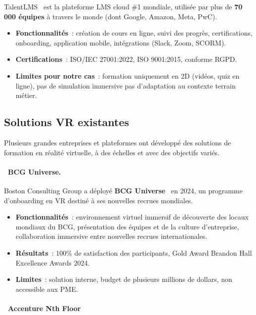 TalentLMS~\cite{talentlms2026} est la plateforme LMS cloud \#1 mondiale, utilisée par plus
de \textbf{70 000 équipes} à travers le monde (dont Google, Amazon, Meta, PwC).

\begin{itemize}
  \item \textbf{Fonctionnalités}~: création de cours en ligne, suivi des progrès, certifications,
    onboarding, application mobile, intégrations (Slack, Zoom, SCORM).
  \item \textbf{Certifications}~: ISO/IEC 27001:2022, ISO 9001:2015, conforme RGPD.
  \item \textbf{Limites pour notre cas}~: formation uniquement en 2D (vidéos, quiz en ligne),
    pas de simulation immersive pas d'adaptation au contexte terrain métier.
\end{itemize}

\subsection{Solutions VR existantes}

Plusieurs grandes entreprises et plateformes ont développé des solutions de formation en
réalité virtuelle, à des échelles et avec des objectifs variés.

\paragraph*{\textbullet~BCG Universe.}

Boston Consulting Group a déployé \textbf{BCG Universe}~\cite{bcg2024} en 2024, un programme
d'onboarding en VR destiné à ses nouvelles recrues mondiales.

\begin{itemize}
  \item \textbf{Fonctionnalités}~: environnement virtuel immersif de découverte des
    locaux mondiaux du BCG, présentation des équipes et de la culture d'entreprise,
    collaboration immersive entre nouvelles recrues internationales.
  \item \textbf{Résultats}~: 100\% de satisfaction des participants, Gold Award
    Brandon Hall Excellence Awards 2024.
  \item \textbf{Limites}~: solution interne, budget de plusieurs millions de dollars,
    non accessible aux PME.
\end{itemize}

\paragraph*{\textbullet~Accenture Nth Floor}

